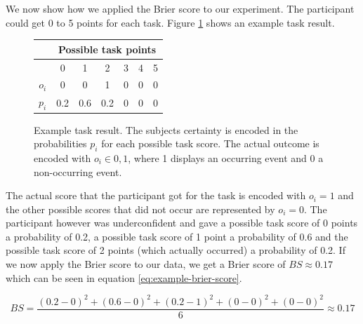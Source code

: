 \documentclass[../main/main.tex]{subfiles}
\begin{document}
	We now show how we applied the Brier score to our experiment. The participant could get 0 to 5 points for each task. Figure \ref{fig:example} shows an example task result.
	
	\begin{figure}[h]
		\centering
		\begin{tabular}{c|c|c|c|c|c|c|}
			& \multicolumn{6}{c|}{Possible task points} \\
			\hline
			& 0 & 1 & 2 & 3 & 4 & 5 \\
			\hline
			$o_i$ & 0 & 0 & 1 & 0 & 0 & 0 \\
			$p_i$ & 0.2 & 0.6 & 0.2 & 0 & 0 & 0\\
		\end{tabular}
		\caption{Example task result. The subjects certainty is encoded in the probabilities $p_i$ for each possible task score. The actual outcome is encoded with $o_i \in {0, 1}$, where 1 displays an occurring event and 0 a non-occurring event.}
		\label{fig:example}
	\end{figure}

	The actual score that the participant got for the task is encoded with $o_i = 1$ and the other possible scores that did not occur are represented by $o_i = 0$. The participant however was underconfident and gave a possible task score of 0 points a probability of 0.2, a possible task score of 1 point a probability of 0.6 and the possible task score of 2 points (which actually occurred) a probability of 0.2. If we now apply the Brier score to our data, we get a Brier score of $BS \approx 0.17$ which can be seen in equation \ref{eq:example-brier-score}.
	
	\begin{equation}
		\label{eq:example-brier-score}
		BS = \frac{(0.2 - 0)^2 + (0.6 - 0)^2 + (0.2 - 1)^2 + (0 - 0)^2 + (0 - 0)^2}{6} \approx 0.17
	\end{equation}
\end{document}
